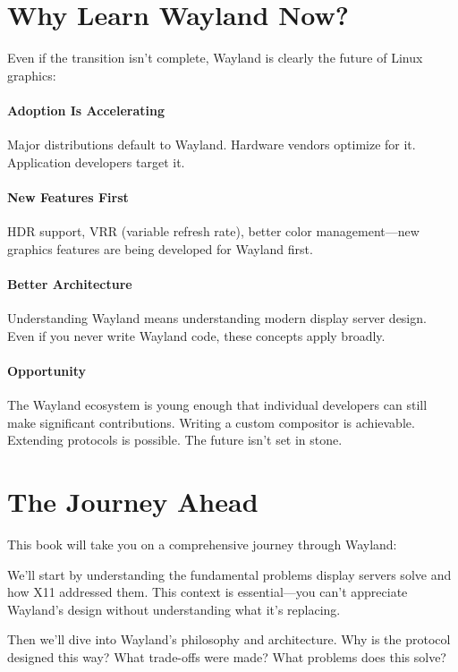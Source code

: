 \section*{Why Learn Wayland Now?}

Even if the transition isn't complete, Wayland is clearly the future of Linux graphics:

\paragraph{Adoption Is Accelerating} Major distributions default to Wayland. Hardware vendors optimize for it. Application developers target it.

\paragraph{New Features First} HDR support, VRR (variable refresh rate), better color management—new graphics features are being developed for Wayland first.

\paragraph{Better Architecture} Understanding Wayland means understanding modern display server design. Even if you never write Wayland code, these concepts apply broadly.

\paragraph{Opportunity} The Wayland ecosystem is young enough that individual developers can still make significant contributions. Writing a custom compositor is achievable. Extending protocols is possible. The future isn't set in stone.

\section*{The Journey Ahead}

This book will take you on a comprehensive journey through Wayland:

We'll start by understanding the fundamental problems display servers solve and how X11 addressed them. This context is essential—you can't appreciate Wayland's design without understanding what it's replacing.

Then we'll dive into Wayland's philosophy and architecture. Why is the protocol designed this way? What trade-offs were made? What problems does this solve?

